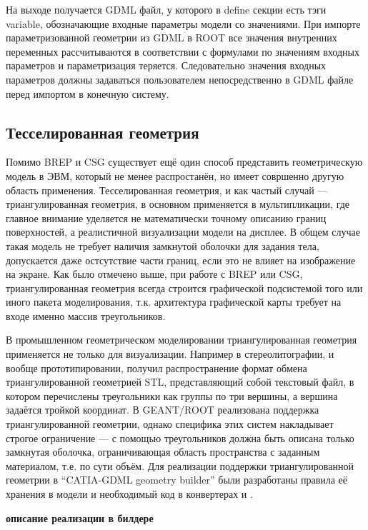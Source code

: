 На выходе получается GDML файл, у которого в define секции есть тэги variable, обозначающие входные параметры модели со значениями. При импорте параметризованной геометрии из GDML в ROOT все значения внутренних переменных рассчитываются в соответствии с формулами по значениям входных параметров и параметризация теряется. Следовательно значения входных параметров должны задаваться пользователем непосредственно в GDML файле перед импортом в конечную систему.

\subsection{Тесселированная геометрия}\label{sec:Tesselated}

Помимо BREP и CSG существует ещё один способ представить геометрическую модель в ЭВМ, который не менее распростанён, но имеет совршенно другую область применения. Тесселированная геометрия, и как частый случай --- триангулированная геометрия, в основном применяется в мультипликации, где главное внимание уделяется не математически точному описанию границ поверхностей, а реалистичной визуализации модели на дисплее. В общем случае такая модель не требует наличия замкнутой оболочки для задания тела, допускается даже остсутствие части границ, если это не влияет на изображение на экране. Как было отмечено выше, при работе с BREP или CSG, триангулированная геометрия всегда строится графической подсистемой того или иного пакета моделирования, т.к. архитектура графической карты требует на входе именно массив треугольников.

В промышленном геометрическом моделировании триангулированная геометрия применяется не только для визуализации. Например в стереолитографии, и вообще прототипировании, получил распространение формат обмена триангулированной геометрией STL, представляющий собой текстовый файл, в котором перечислены треугольники как группы по три вершины, а вершина задаётся тройкой координат. В GEANT/ROOT реализована поддержка триангулированной геометрии, однако специфика этих систем накладывает строгое ограничение --- с помощью треугольников должна быть описана только замкнутая оболочка, ограничивающая область пространства с заданным материалом, т.е. по сути объём.
Для реализации поддержки триангулированной геометрии в ``CATIA-GDML geometry builder'' были разработаны правила её хранения в модели и необходимый код в конвертерах  и .

\todo \textbf{описание реализации в билдере}

